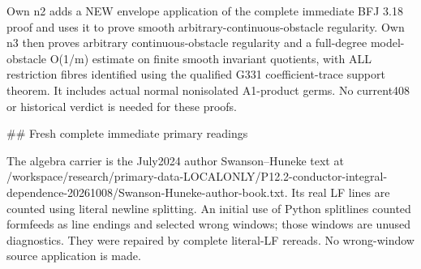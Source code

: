 \documentclass[11pt]{article}
\begin{document}
\begin{RetainedDATA}
Own n2 adds a NEW envelope application of the complete immediate BFJ 3.18 proof and uses it to prove smooth arbitrary-continuous-obstacle regularity. Own n3 then proves arbitrary continuous-obstacle regularity and a full-degree model-obstacle O(1/m) estimate on finite smooth invariant quotients, with ALL restriction fibres identified using the qualified G331 coefficient-trace support theorem. It includes actual normal nonisolated A1-product germs. No current408 or historical verdict is needed for these proofs.

## Fresh complete immediate primary readings

The algebra carrier is the July2024 author Swanson--Huneke text at /workspace/research/primary-data-LOCALONLY/P12.2-conductor-integral-dependence-20261008/Swanson-Huneke-author-book.txt. Its real LF lines are counted using literal newline splitting. An initial use of Python splitlines counted formfeeds as line endings and selected wrong windows; those windows are unused diagnostics. They were repaired by complete literal-LF rereads. No wrong-window source application is made.


\end{RetainedDATA}
\end{document}
